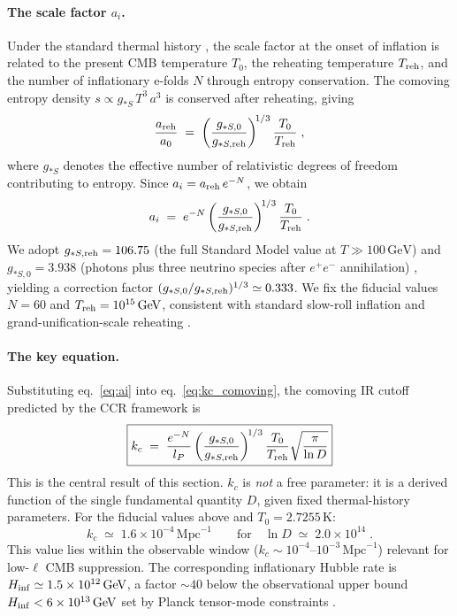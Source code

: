 \paragraph{The scale factor $a_i$.}
Under the standard thermal history \cite{Kolb:1990,Ryden:2017}, the scale
factor at the onset of inflation is related to the present CMB temperature
$T_0$, the reheating temperature $T_{\rm reh}$, and the number of
inflationary e-folds $N$ through entropy conservation. The comoving entropy
density $s \propto g_{*S}\,T^3\,a^3$ is conserved after reheating, giving
%
\begin{equation}
  \frac{a_{\rm reh}}{a_0}
  \;=\;
  \left(\frac{g_{*S,0}}{g_{*S,\rm reh}}\right)^{\!1/3}
  \frac{T_0}{T_{\rm reh}} \;,
  \label{eq:entropy_conservation}
\end{equation}
%
where $g_{*S}$ denotes the effective number of relativistic degrees of freedom
contributing to entropy. Since $a_i = a_{\rm reh}\,e^{-N}$, we obtain
%
\begin{equation}
  a_i \;=\; e^{-N}
  \left(\frac{g_{*S,0}}{g_{*S,\rm reh}}\right)^{\!1/3}
  \frac{T_0}{T_{\rm reh}} \;.
  \label{eq:ai}
\end{equation}
%
We adopt $g_{*S,\rm reh} = 106.75$ (the full Standard Model value at
$T \gg 100\,\mathrm{GeV}$) and $g_{*S,0} = 3.938$ (photons plus three
neutrino species after $e^+e^-$ annihilation) \cite{Kolb:1990}, yielding
a correction factor
$(g_{*S,0}/g_{*S,\rm reh})^{1/3} \simeq 0.333$.
We fix the fiducial values $N = 60$ and $T_{\rm reh} = 10^{15}\,\mathrm{GeV}$,
consistent with standard slow-roll inflation and grand-unification-scale
reheating \cite{Baumann:2009}.

\paragraph{The key equation.}
Substituting eq.~\eqref{eq:ai} into eq.~\eqref{eq:kc_comoving}, the comoving
IR cutoff predicted by the CCR framework is
%
\begin{equation}
  \boxed{
    k_c \;=\; \frac{e^{-N}}{l_P}
    \left(\frac{g_{*S,0}}{g_{*S,\rm reh}}\right)^{\!1/3}
    \frac{T_0}{T_{\rm reh}}
    \sqrt{\frac{\pi}{\ln D}}
  }
  \label{eq:kc_final}
\end{equation}
%
This is the central result of this section. $k_c$ is \emph{not} a free
parameter: it is a derived function of the single fundamental quantity $D$,
given fixed thermal-history parameters.
For the fiducial values above and $T_0 = 2.7255\,\mathrm{K}$:
%
\begin{equation}
  k_c \;\simeq\; 1.6\times 10^{-4}\,\mathrm{Mpc}^{-1}
  \qquad\text{for}\quad \ln D \;\simeq\; 2.0\times 10^{14} \;.
  \label{eq:kc_numerical}
\end{equation}
%
This value lies within the observable window
($k_c \sim 10^{-4}$--$10^{-3}\,\mathrm{Mpc}^{-1}$) relevant for low-$\ell$
CMB suppression. The corresponding inflationary Hubble rate is
$H_{\rm inf} \simeq 1.5\times 10^{12}\,\mathrm{GeV}$, a factor $\sim 40$
below the observational upper bound
$H_{\rm inf} < 6\times 10^{13}\,\mathrm{GeV}$ set by Planck tensor-mode
constraints \cite{Planck:2018inflation}.

